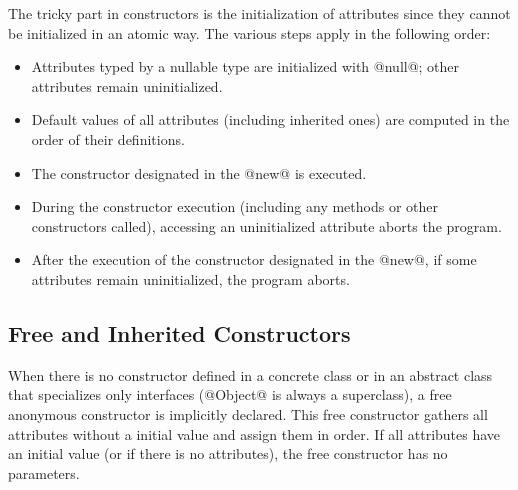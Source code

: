 The tricky part in constructors is the initialization of attributes since they cannot be initialized in an atomic way.
The various steps apply in the following order:
\begin{itemize}
\item Attributes typed by a nullable type are initialized with @null@; other attributes remain uninitialized.
\item Default values of all attributes (including inherited ones) are computed in the order of their definitions.
\item The constructor designated in the @new@ is executed.
\item During the constructor execution (including any methods or other constructors called), accessing an uninitialized attribute aborts the program.
\item After the execution of the constructor designated in the @new@, if some attributes remain uninitialized, the program aborts.
\end{itemize}

\begin{comment}
@isset@ can be used to avoid aborting during the construction.
It checks if an attribute is defined.
\begin{lst}
class Foo
	var x: Int
	fun safe_x: nullable Int
	do
		if isset self.x then
			return self.x
		else
			return null
		end
	end
	init
	do
		print safe_x or else 0 # outputs 0
		# "print x" would have aborted the program
		self.x = 5
		print safe_x or else 0 # outputs "5"
		print x # outputs "5". It is safe.
	end
end
var f = new Foo
\end{lst}
\end{comment}

\subsection{Free and Inherited Constructors}\label{init inheritance}

When there is no constructor defined in a concrete class or in an abstract class that specializes only interfaces (@Object@ is always a superclass), a free anonymous constructor is implicitly declared.
This free constructor gathers all attributes without a initial value and assign them in order.
If all attributes have an initial value (or if there is no attributes), the free constructor has no parameters.

